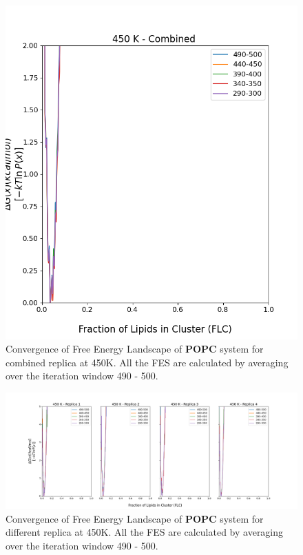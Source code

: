 \documentclass{biophys-new}
\begin{document}
\begin{figure}[hbt!]
\centering
\includegraphics[width=0.6\linewidth]{all_plots/ClusterLipids2Total/DPPC_POPC_CHOL/450K/Convergence_POPC_MULTI__450_ClusterLipids2Total.png}
\caption{Convergence of Free Energy Landscape of \textbf{POPC} system for combined replica at 450K. All the FES are calculated by averaging over the iteration window 490 - 500.}
\label{fig:view}

\end{figure}

\begin{figure}[hbt!]
\centering
\includegraphics[width=1.1\linewidth]{all_plots/ClusterLipids2Total/DPPC_POPC_CHOL/450K/Convergence_POPC_450_ClusterLipids2Total.png}
\caption{Convergence of Free Energy Landscape of \textbf{POPC} system for different replica at 450K. All the FES are calculated by averaging over the iteration window 490 - 500.}
\label{fig:view}

\end{figure}
\end{document}
